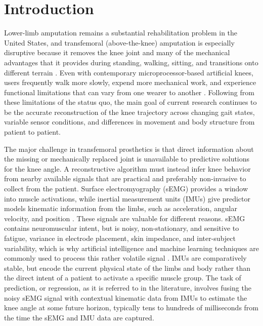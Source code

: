 \documentclass[referee,lineno,pdflatex,sn-vancouver-num]{sn-jnl}
\begin{document}

\maketitle

\section{Introduction}\label{sec:introduction}
Lower-limb amputation remains a substantial rehabilitation problem in the United States, and transfemoral (above-the-knee) amputation is especially disruptive because it removes the knee joint and many of the mechanical advantages that it provides during standing, walking, sitting, and transitions onto different terrain \cite{dillingham2002,pran2021}. Even with contemporary microprocessor-based artificial knees, users frequently walk more slowly, expend more mechanical work, and experience functional limitations that can vary from one wearer to another \cite{pinhey2022}. Following from these limitations of the status quo, the main goal of current research continues to be the accurate reconstruction of the knee trajectory across changing gait states, variable sensor conditions, and differences in movement and body structure from patient to patient.

The major challenge in transfemoral prosthetics is that direct information about the missing or mechanically replaced joint is unavailable to predictive solutions for the knee angle. A reconstructive algorithm must instead infer knee behavior from nearby available signals that are practical and preferably non-invasive to collect from the patient. Surface electromyography (sEMG) provides a window into muscle activations, while inertial measurement units (IMUs) give predictor models kinematic information from the limbs, such as acceleration, angular velocity, and position \cite{deluca1997,farina2014}. These signals are valuable for different reasons. sEMG contains neuromuscular intent, but is noisy, non-stationary, and sensitive to fatigue, variance in electrode placement, skin impedance, and inter-subject variability, which is why artificial intelligence and machine learning techniques are commonly used to process this rather volatile signal \cite{huang2008,chowdhury2013,phinyomark2018}. IMUs are comparatively stable, but encode the current physical state of the limbs and body rather than the direct intent of a patient to activate a specific muscle group. The task of prediction, or regression, as it is referred to in the literature, involves fusing the noisy sEMG signal with contextual kinematic data from IMUs to estimate the knee angle at some future horizon, typically tens to hundreds of milliseconds from the time the sEMG and IMU data are captured.
\end{document}
